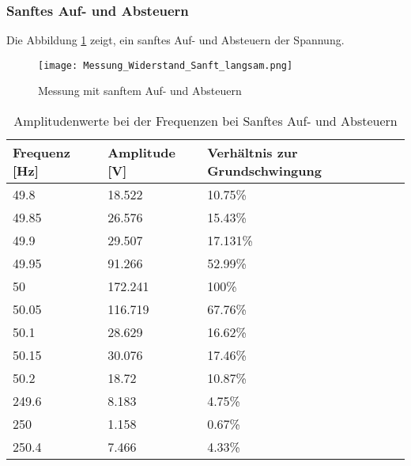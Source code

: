 \newpage
\subsubsection*{Sanftes Auf- und Absteuern}
Die Abbildung \ref{fig:Mess_Sanft_langsam} zeigt, ein sanftes Auf- und Absteuern der Spannung.


\begin{figure}[ht!]
	\centering
	\texttt{[image: Messung\_Widerstand\_Sanft\_langsam.png]}	
	\caption{Messung mit sanftem Auf- und Absteuern}\label{fig:Mess_Sanft_langsam}
\end{figure}


\begin{table}[ht!]
	\centering
	\begin{tabular}{|l|l|l|}
		\hline
		Frequenz {[}Hz{]} & Amplitude {[}V{]} & Verhältnis zur Grundschwingung \\ \hline
		49.8              & 18.522            & 10.75\%                        \\ \hline
		49.85             & 26.576            & 15.43\%                        \\ \hline
		49.9              & 29.507            & 17.131\%                       \\ \hline
		49.95             & 91.266            & 52.99\%                        \\ \hline
		50                & 172.241           & 100\%                          \\ \hline
		50.05             & 116.719           & 67.76\%                        \\ \hline
		50.1              & 28.629            & 16.62\%                        \\ \hline
		50.15             & 30.076            & 17.46\%                        \\ \hline
		50.2              & 18.72             & 10.87\%                        \\ \hline
		249.6             & 8.183             & 4.75\%                         \\ \hline
		250               & 1.158             & 0.67\%                         \\ \hline
		250.4             & 7.466             & 4.33\%                         \\ \hline
	\end{tabular}
\caption{Amplitudenwerte bei der Frequenzen bei Sanftes Auf- und Absteuern}\label{tab:Mess_Spannung_AufAb_sanft}
\end{table}

